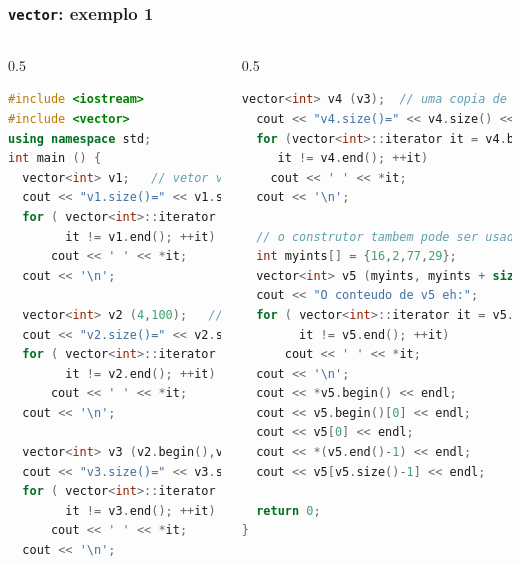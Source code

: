 \documentclass[xcolor={dvipsnames,table},aspectratio=169]{beamer}
\begin{document}
\begin{frame}[fragile]\frametitle{\texttt{vector}: exemplo 1}
\begin{columns}
\begin{column}{0.5\linewidth}
\begin{lstlisting}[language=C++,basicstyle=\ttfamily\tiny]
#include <iostream>
#include <vector>
using namespace std;
int main () {
  vector<int> v1;   // vetor vazio de inteiros
  cout << "v1.size()=" << v1.size() << endl;
  for ( vector<int>::iterator it = v1.begin();
        it != v1.end(); ++it)
      cout << ' ' << *it;
  cout << '\n';

  vector<int> v2 (4,100);   // quatro ints com 100
  cout << "v2.size()=" << v2.size() << endl;
  for ( vector<int>::iterator it = v2.begin();
        it != v2.end(); ++it)
      cout << ' ' << *it;
  cout << '\n';

  vector<int> v3 (v2.begin(),v2.end()); // it. de v2
  cout << "v3.size()=" << v3.size() << endl;
  for ( vector<int>::iterator it = v3.begin();
        it != v3.end(); ++it)
      cout << ' ' << *it;
  cout << '\n';
\end{lstlisting}
\end{column}
\begin{column}{0.5\linewidth}
\begin{lstlisting}[language=C++,basicstyle=\ttfamily\tiny]
  vector<int> v4 (v3);  // uma copia de v3
  cout << "v4.size()=" << v4.size() << endl;
  for (vector<int>::iterator it = v4.begin();
     it != v4.end(); ++it)
    cout << ' ' << *it;
  cout << '\n';

  // o construtor tambem pode ser usado com arrays
  int myints[] = {16,2,77,29};
  vector<int> v5 (myints, myints + sizeof(myints) / sizeof(int) );
  cout << "O conteudo de v5 eh:";
  for ( vector<int>::iterator it = v5.begin();
        it != v5.end(); ++it)
      cout << ' ' << *it;
  cout << '\n';
  cout << *v5.begin() << endl;
  cout << v5.begin()[0] << endl;
  cout << v5[0] << endl;
  cout << *(v5.end()-1) << endl;
  cout << v5[v5.size()-1] << endl;

  return 0;
}
\end{lstlisting}
\end{column}
\end{columns}
\end{frame}
\end{document}
